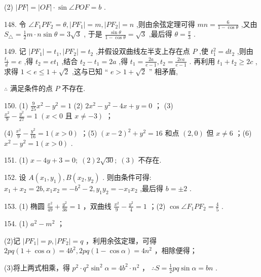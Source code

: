 \documentclass[10pt]{article}
\begin{document}
(2) \(\left| {PF}\right|  = \left| {OF}\right|  \cdot  \sin \angle {POF} = b\) .

148. 令 \(\angle {F}_{1}P{F}_{2} = \theta ,\left| {P{F}_{1}}\right|  = m,\left| {P{F}_{2}}\right|  = n\) ,则由余弦定理可得 \({mn} = \frac{6}{1 - \cos \theta }\) ,又由 \({S}_{\bigtriangleup } = \frac{1}{2}m \cdot  n\sin \theta  = 3\sqrt{3}\) , 于是 \(\frac{\sin \theta }{1 - \cos \theta } = \sqrt{3}\) ,最后得 \(\theta  = \frac{\pi }{3}\) .

149. 记 \(\left| {P{F}_{1}}\right|  = {t}_{1},\left| {P{F}_{2}}\right|  = {t}_{2}\) ,并假设双曲线左半支上存在点 \(P\) ,使 \({t}_{1}^{2} = d{t}_{2}\) ,则由 \(\frac{{t}_{1}}{d} = e\) ,得 \({t}_{2} = e{t}_{1}\) ,结合 \({t}_{2} - {t}_{1} = {2a}\) ,得 \({t}_{1} = \frac{2a}{e - 1},{t}_{2} = \frac{2ea}{e - 1}\) . 再利用 \({t}_{1} + {t}_{2} \geq  {2c}\) ,求得 \(1 < e \leq  1 + \sqrt{2}\) ,这与已知 “ \(e > 1 + \sqrt{2}\) ” 相矛盾,

\(\therefore\) 满足条件的点 \(P\) 不存在.

150. (1) \(\frac{9}{25}{x}^{2} - {y}^{2} = 1\) (2) \(2{x}^{2} - {y}^{2} - {4x} + y = 0\) ； (3) \(\frac{{x}^{2}}{9} - \frac{{y}^{2}}{27} = 1\;\left( {x < 0\text{ 且 }x \neq   - 3}\right)\) ；

(4) \(\frac{{x}^{2}}{9} - \frac{{y}^{2}}{16} = 1\left( {x > 0}\right)\) ；(5) \({\left( x - 2\right) }^{2} + {y}^{2} = {16}\) 和点 \(\left( {2,0}\right)\) 但 \(x \neq  6\) ；(6) \({x}^{2} - {y}^{2} = 1\left( {x > 0}\right)\) .

151. (1) \(x - {4y} + 3 = 0;\;\left( 2\right) 2\sqrt{30};\;\left( 3\right)\) 不存在.

152. 设 \(A\left( {{x}_{1},{y}_{1}}\right) ,B\left( {{x}_{2},{y}_{2}}\right)\) . 则由条件可得: \({x}_{1} + {x}_{2} = {2b},{x}_{1}{x}_{2} =  - {b}^{2} - 2,{y}_{1}{y}_{2} =  - {x}_{1}{x}_{2}\) ,最后得 \(b =  \pm  2\) .

153. (1) 椭圆 \(\frac{{x}^{2}}{49} + \frac{{y}^{2}}{36} = 1\) ，双曲线 \(\frac{{x}^{2}}{9} - \frac{{y}^{2}}{4} = 1\) ；(2) \(\cos \angle {F}_{1}P{F}_{2} = \frac{4}{5}\) .

154. (1) \({a}^{2} - {m}^{2}\) ；

(2)记 \(\left| {P{F}_{1}}\right|  = p,\left| {P{F}_{2}}\right|  = q\) ，利用余弦定理，可得 \({2p}q\left( {1 + \cos \alpha }\right)  = 4{b}^{2},{2p}q\left( {1 - \cos \alpha }\right)  = 4{n}^{2}\) ，相除便得；

(3)将上两式相乘，得 \({p}^{2} \cdot  {q}^{2}{\sin }^{2}\alpha  = 4{b}^{2} \cdot  {n}^{2}\) ， \(\therefore S = \frac{1}{2}{pq}\sin \alpha  = {bn}\) .
\end{document}
